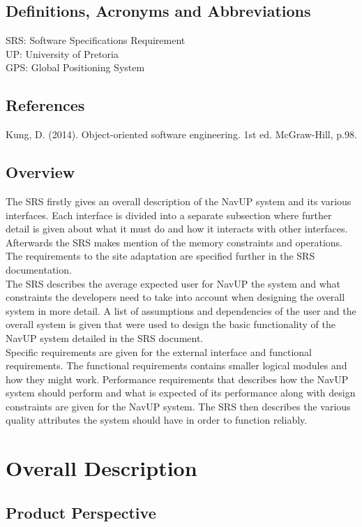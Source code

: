 \documentclass[a4paper,12pt]{article}
\begin{document}
\subsection{Definitions, Acronyms and Abbreviations}
SRS:	Software Specifications Requirement\\
UP:		University of Pretoria\\
GPS:	Global Positioning System
\subsection{References}
 Kung, D. (2014). Object-oriented software engineering. 1st ed. McGraw-Hill, p.98.
\subsection{Overview}
The SRS firstly gives an overall description of the NavUP system and its various interfaces. Each interface is divided into a separate subsection where further detail is given about what it must do and how it interacts with other interfaces. Afterwards the SRS makes mention of the memory constraints and operations. The requirements to the site adaptation are specified further in the SRS documentation.\\
The SRS describes the average expected user for NavUP the system and what constraints the developers need to take into account when designing the overall system in more detail. A list of assumptions and dependencies of the user and the overall system is given that were used to design the basic functionality of the NavUP system detailed in the SRS document.\\
Specific requirements are given for the external interface and functional requirements. The functional requirements contains smaller logical modules and how they might work. Performance requirements that describes how the NavUP system should perform and what is expected of its performance along with design constraints are given for the NavUP system. The SRS then describes the various quality attributes the system should have in order to function reliably.
\section{Overall Description}
\subsection{Product Perspective}
\end{document}
